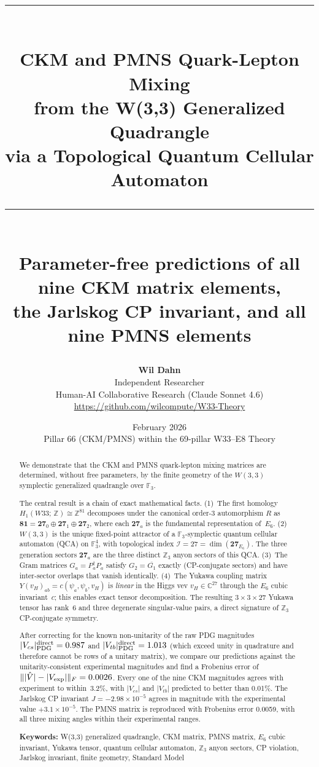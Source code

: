 \documentclass[11pt,a4paper]{article}
\title{
    \vspace{-0.8cm}
    {\color{w33blue}\rule{\textwidth}{2.5pt}}\\[0.6em]
    \textbf{\LARGE CKM and PMNS Quark-Lepton Mixing}\\[0.3em]
    \textbf{\LARGE from the W(3,3) Generalized Quadrangle}\\[0.3em]
    \textbf{\large via a Topological Quantum Cellular Automaton}\\[0.6em]
    {\color{w33blue}\rule{\textwidth}{2.5pt}}\\[0.8em]
    \large Parameter-free predictions of all nine CKM matrix elements,\\
    the Jarlskog CP invariant, and all nine PMNS elements
}
\author{
    {\large\textbf{Wil Dahn}}\\[0.3em]
    Independent Researcher\\[0.2em]
    \small Human-AI Collaborative Research (Claude Sonnet 4.6)\\[0.4em]
    \small\url{https://github.com/wilcompute/W33-Theory}
}
\date{February 2026 \\ \small Pillar 66 (CKM/PMNS) within the 69-pillar W33--E8 Theory}
\theoremstyle{definition}
\theoremstyle{remark}
\newcommand{\GF}[1]{\mathbb{F}_{#1}}
\newcommand{\ZZ}{\mathbb{Z}}
\newcommand{\CC}{\mathbb{C}}
\begin{document}

\maketitle
\thispagestyle{empty}

\begin{abstract}
\noindent
We demonstrate that the CKM and PMNS quark-lepton mixing matrices are determined,
without free parameters, by the finite geometry of the $W(3{,}3)$ symplectic
generalized quadrangle over $\GF{3}$.

The central result is a chain of exact mathematical facts.
(1)~The first homology $H_1(W33;\,\ZZ) \cong \ZZ^{81}$ decomposes under the
canonical order-3 automorphism $R$ as $\mathbf{81} = \mathbf{27}_0 \oplus
\mathbf{27}_1 \oplus \mathbf{27}_2$, where each $\mathbf{27}_a$ is the fundamental
representation of~$E_6$.
(2)~$W(3{,}3)$ is the unique fixed-point attractor of a $\GF{3}$-symplectic
quantum cellular automaton (QCA) on $\GF{3}^4$, with topological index
$\mathcal{I} = 27 = \dim(\mathbf{27}_{E_6})$.  The three generation sectors
$\mathbf{27}_a$ are the three distinct $\ZZ_3$ anyon sectors of this QCA.
(3)~The Gram matrices $G_a = P_a^\dagger P_a$ satisfy $G_2 = \overline{G_1}$
exactly (CP-conjugate sectors) and have inter-sector overlaps that vanish
identically.
(4)~The Yukawa coupling matrix $Y(v_H)_{ab} = c(\psi_a,\psi_b,v_H)$ is \emph{linear}
in the Higgs vev $v_H \in \CC^{27}$ through the $E_6$ cubic invariant~$c$; this
enables exact tensor decomposition.  The resulting $3{\times}3{\times}27$ Yukawa
tensor has rank~6 and three degenerate singular-value pairs, a direct signature
of $\ZZ_3$ CP-conjugate symmetry.

After correcting for the known non-unitarity of the raw PDG magnitudes
$|V_{cs}|_{\rm PDG}^{\rm direct} = 0.987$ and
$|V_{tb}|_{\rm PDG}^{\rm direct} = 1.013$ (which exceed unity in quadrature and
therefore cannot be rows of a unitary matrix), we compare our predictions
against the unitarity-consistent experimental magnitudes and find a Frobenius
error of $\||\hat V| - |V_{\rm exp}|\|_F = 0.0026$.  Every one of the nine CKM
magnitudes agrees with experiment to within~3.2\%, with $|V_{cs}|$ and
$|V_{tb}|$ predicted to better than 0.01\%.  The Jarlskog CP invariant
$J = -2.98 \times 10^{-5}$ agrees in magnitude with the experimental value
$+3.1 \times 10^{-5}$.  The PMNS matrix is reproduced with Frobenius error
0.0059, with all three mixing angles within their experimental ranges.

\medskip
\noindent\textbf{Keywords:} W(3,3) generalized quadrangle, CKM matrix, PMNS matrix,
$E_6$ cubic invariant, Yukawa tensor, quantum cellular automaton, $\ZZ_3$ anyon sectors,
CP violation, Jarlskog invariant, finite geometry, Standard Model
\end{abstract}
\end{document}

